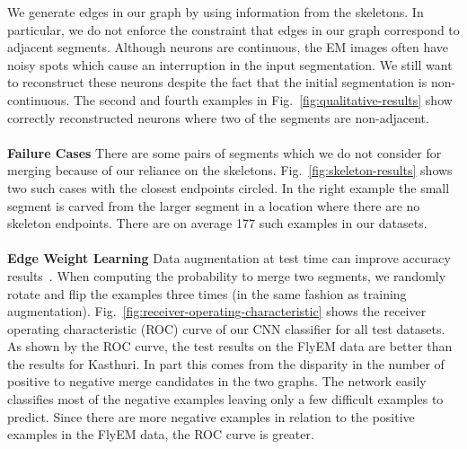 We generate edges in our graph by using information from the skeletons. 
In particular, we do not enforce the constraint that edges in our graph correspond to adjacent segments.
Although neurons are continuous, the EM images often have noisy spots which cause an interruption in the input segmentation.
We still want to reconstruct these neurons despite the fact that the initial segmentation is non-continuous. 
The second and fourth examples in Fig.~\ref{fig:qualitative-results} show correctly reconstructed neurons where two of the segments are non-adjacent. 
\\~\\
\noindent\textbf{Failure Cases}
There are some pairs of segments which we do not consider for merging because of our reliance on the skeletons.
Fig.~\ref{fig:skeleton-results} shows two such cases with the closest endpoints circled. 
In the right example the small segment is carved from the larger segment in a location where there are no skeleton endpoints. 
There are on average 177 such examples in our datasets.
\\~\\
\noindent\textbf{Edge Weight Learning}
Data augmentation at test time can improve accuracy results~\cite{lee2017superhuman,zeng2017deepem3d}.
When computing the probability to merge two segments, we randomly rotate and flip the examples three times (in the same fashion as training augmentation).
Fig.~\ref{fig:receiver-operating-characteristic} shows the receiver operating characteristic (ROC) curve of our CNN classifier for all test datasets.
As shown by the ROC curve, the test results on the FlyEM data are better than the results for Kasthuri.
In part this comes from the disparity in the number of positive to negative merge candidates in the two graphs. 
The network easily classifies most of the negative examples leaving only a few difficult examples to predict.
Since there are more negative examples in relation to the positive examples in the FlyEM data, the ROC curve is greater.

